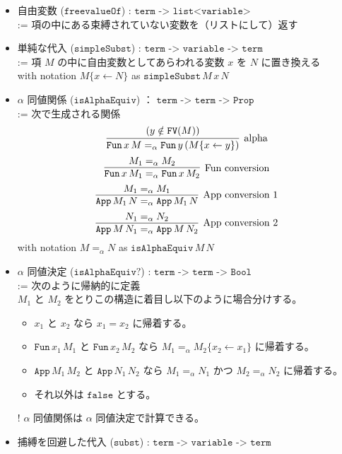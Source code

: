 \documentclass[dvipdfmx]{jsarticle}
\begin{document}
\begin{itemize}
  \item 自由変数 (\(\texttt{freevalueOf}\)) : \(\texttt{term -> list<variable>}\) \\
    := 項の中にある束縛されていない変数を（リストにして）返す
  \item 単純な代入 (\(\texttt{simpleSubst}\)) : \(\texttt{term -> variable -> term}\) \\
    := 項 \(M\) の中に自由変数としてあらわれる変数 \(x\) を \(N\) に置き換える \\
    with notation \(M\{x \leftarrow N\}\) as \(\texttt{simpleSubst} \, M \, x \, N\)
  \item \(\alpha\) 同値関係 (\(\texttt{isAlphaEquiv}\)) ： \(\texttt{term -> term -> Prop}\) \\
    := 次で生成される関係
      \[\infer[\text{alpha}]{\texttt{Fun} \, x \, M =_{\alpha} \texttt{Fun} \, y \, (M\{x \leftarrow y\})}{(y \notin \texttt{FV}(M))}\]
      \[\infer[\text{Fun conversion}]{\texttt{Fun} \, x \, M_1 =_{\alpha} \texttt{Fun} \, x \, M_2}{M_1 =_{\alpha} M_2}\]
      \[\infer[\text{App conversion 1}]{\texttt{App} \, M_1 \, N =_{\alpha} \texttt{App} \, M_1 \, N}{M_1 =_{\alpha} M_1}\]
      \[\infer[\text{App conversion 2}]{\texttt{App} \, M \, N_1 =_{\alpha} \texttt{App} \, M \, N_2}{N_1 =_{\alpha} N_2}\]
    with notation \(M =_{\alpha} N\) as \(\texttt{isAlphaEquiv} \, M \, N\)
  \item \(\alpha\) 同値決定 (\(\texttt{isAlphaEquiv?}\)) : \(\texttt{term -> term -> Bool}\) \\
    := 次のように帰納的に定義 \\
      \(M_1\) と \(M_2\) をとりこの構造に着目し以下のように場合分けする。
      \begin{itemize}
        \item \(x_1\) と \(x_2\) なら
          \(x_1 = x_2\) に帰着する。
        \item \(\texttt{Fun} \, x_1 \, M_1\) と \(\texttt{Fun} \, x_2 \, M_2\) なら
          \(M_1 =_{\alpha} M_2\{x_2 \leftarrow x_1\}\) に帰着する。
        \item \(\texttt{App} \, M_1 \, M_2\) と \(\texttt{App} \, N_1 \, N_2\) なら
          \(M_1 =_{\alpha} N_1\) かつ \(M_2 =_{\alpha} N_2\) に帰着する。
        \item それ以外は \(\texttt{false}\) とする。
      \end{itemize}
  \item[!] \(\alpha\) 同値関係は \(\alpha\) 同値決定で計算できる。
  \item 捕縛を回避した代入 (\(\texttt{subst}\)) : \(\texttt{term -> variable -> term}\) \\

\end{itemize}
\end{document}
